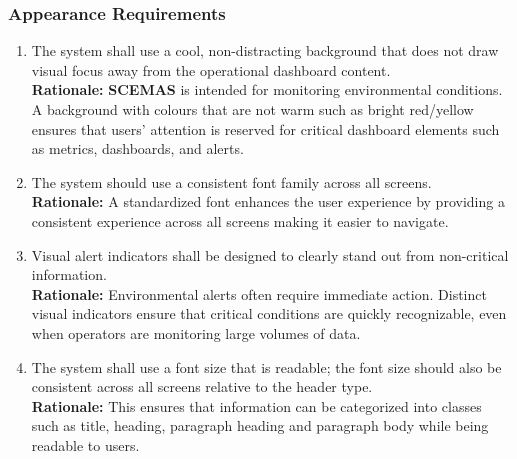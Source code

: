 \documentclass[]{article}
\begin{document}
\subsubsection{Appearance Requirements}
\label{ssub:appearance_requirements}
\begin{enumerate}[{LF-A}1. ]
	\item The system shall use a cool, non-distracting background that does not draw visual focus away from the operational dashboard content.\\
	\textbf{Rationale:} \textbf{SCEMAS} is intended for monitoring environmental conditions. A background with colours that are not warm such as bright red/yellow ensures that users' attention is reserved for critical dashboard elements such as metrics, dashboards, and alerts.
	\item The system should use a consistent font family across all screens.\\
	\textbf{Rationale:} A standardized font enhances the user experience by providing a consistent experience across all screens making it easier to navigate.
	\item Visual alert indicators shall be designed to clearly stand out from non-critical information.\\
	\textbf{Rationale:} Environmental alerts often require immediate action. Distinct visual indicators ensure that critical conditions are quickly recognizable, even when operators are monitoring large volumes of data.
	\item The system shall use a font size that is readable; the font size should also be consistent across all screens relative to the header type.\\
	\textbf{Rationale:} This ensures that information can be categorized into classes such as title, heading, paragraph heading and paragraph body while being readable to users.
\end{enumerate}
\end{document}
